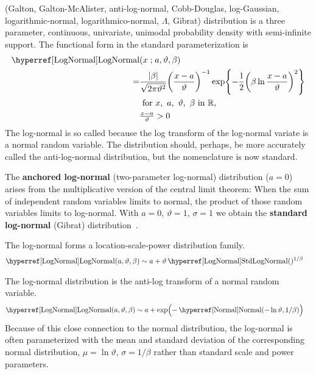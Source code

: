 

\label{sec:LogNormal}
 (Galton, Galton-McAlister, anti-log-normal, Cobb-Douglas, log-Gaussian, logarithmic-normal, logarithmico-normal, $\Lambda$, Gibrat) distribution \cite{Galton1879, McAlister1879, Johnson1994}
 is  a three parameter, continuous, univariate, unimodal probability density with semi-infinite support. The functional form in the standard  parameterization is
 \begin{align}
 \label{LogNormal}
\opr{LogNormal}&(x\given a, \vartheta,\beta) 
 \\ \notag = & \frac{|\beta|}{\sqrt{2\pi \vartheta^2}} \Left(\frac{x-a}{\vartheta}\Right)^{-1} \exp\Left\{-\frac{1}{2} \Left(\beta \ln \frac{x-a}{\vartheta} \Right)^2 \Right\}  \checked
\\ \notag
& \text{ for } x,\ a,\ \vartheta,\ \beta \  \text{in } \Real,  	
 \\ \nonumber
 & \tfrac{x-a}{\vartheta}>0
\end{align}
The log-normal is so called because the log transform of the log-normal variate is a normal random variable. The distribution should, perhaps, be more accurately called the anti-log-normal distribution, but the nomenclature is now standard. 



The {\bf anchored log-normal} (two-parameter log-normal) distribution ($a=0$) arises from the multiplicative version of the central limit theorem: When the sum of independent random variables limits to normal, the product of those random variables limits to log-normal.
With $a=0$, $\vartheta=1$, $\sigma=1$  we obtain the  {\bf standard log-normal} (Gibrat) distribution~\cite{Gibrat1931}.


The log-normal forms a location-scale-power distribution family.
\begin{align*}
\opr{LogNormal}(a, \vartheta, \beta) &\sim a+ \vartheta  \oprr{StdLogNormal}{LogNormal}()^{1/\beta}
\checked
\end{align*}


The log-normal distribution is the anti-log transform of a normal random variable. 
\begin{align*}
\opr{LogNormal}(a, \vartheta, \beta) &\sim a+ \exp\Bigl(- \opr{Normal}(-\ln \vartheta,1/\beta)\Bigr) 
\checked
\end{align*}
Because of this close connection to the normal distribution, the log-normal is often parameterized with the mean and standard deviation of the corresponding normal distribution, $\mu=\ln \vartheta$, $\sigma=1/\beta$ rather than standard scale and power parameters. 


